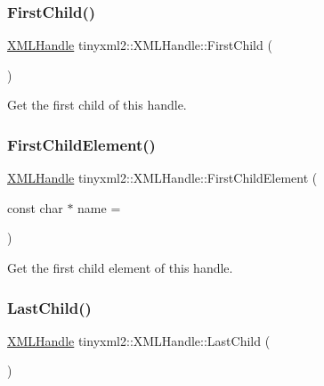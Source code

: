 \subsubsection{\texorpdfstring{First\+Child()}{FirstChild()}}
{\footnotesize\ttfamily \mbox{\hyperlink{classtinyxml2_1_1_x_m_l_handle}{X\+M\+L\+Handle}} tinyxml2\+::\+X\+M\+L\+Handle\+::\+First\+Child (\begin{DoxyParamCaption}{ }\end{DoxyParamCaption})\hspace{0.3cm}{\ttfamily [inline]}}



Get the first child of this handle. 

\mbox{\label{classtinyxml2_1_1_x_m_l_handle_a74b04dd0f15e0bf01860e282b840b6a3}} 
\subsubsection{\texorpdfstring{First\+Child\+Element()}{FirstChildElement()}}
{\footnotesize\ttfamily \mbox{\hyperlink{classtinyxml2_1_1_x_m_l_handle}{X\+M\+L\+Handle}} tinyxml2\+::\+X\+M\+L\+Handle\+::\+First\+Child\+Element (\begin{DoxyParamCaption}\item[{const char $\ast$}]{name = {} }\end{DoxyParamCaption})\hspace{0.3cm}{\ttfamily [inline]}}



Get the first child element of this handle. 

\mbox{\label{classtinyxml2_1_1_x_m_l_handle_a9d09f04435f0f2f7d0816b0198d0517b}} 
\subsubsection{\texorpdfstring{Last\+Child()}{LastChild()}}
{\footnotesize\ttfamily \mbox{\hyperlink{classtinyxml2_1_1_x_m_l_handle}{X\+M\+L\+Handle}} tinyxml2\+::\+X\+M\+L\+Handle\+::\+Last\+Child (\begin{DoxyParamCaption}{ }\end{DoxyParamCaption})\hspace{0.3cm}{\ttfamily [inline]}}



